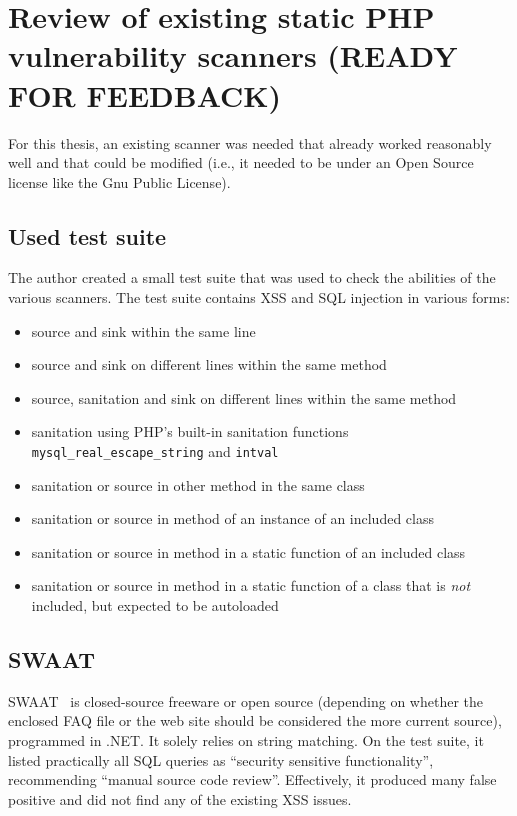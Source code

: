 \chapter{Review of existing static PHP vulnerability scanners (READY FOR FEEDBACK)}
\label{scanners}

For this thesis, an existing scanner was needed that already worked reasonably well and that could be modified (i.e., it needed to be under an Open Source license like the Gnu Public License).

\section{Used test suite}
The author created a small test suite that was used to check the abilities of the various scanners. The test suite contains XSS and SQL injection in various forms:
\begin{itemize}
 \item source and sink within the same line
 \item source and sink on different lines within the same method
 \item source, sanitation and sink on different lines within the same method
 \item sanitation using PHP's built-in sanitation functions \texttt{mysql\_real\_escape\_string} and \texttt{intval}
 \item sanitation or source in other method in the same class
 \item sanitation or source in method of an instance of an included class
 \item sanitation or source in method in a static function of an included class
 \item sanitation or source in method in a static function of a class that is \emph{not} included, but expected to be autoloaded
\end{itemize}

\section{SWAAT}
\label{swaat}
SWAAT~\cite{swaat} is closed-source freeware or open source (depending on whether the enclosed FAQ file or the web site should be considered the more current source), programmed in .NET. It solely relies on string matching. On the test suite, it listed practically all SQL queries as ``security sensitive functionality'', recommending ``manual source code review''. Effectively, it produced many false positive and did not find any of the existing XSS issues.

